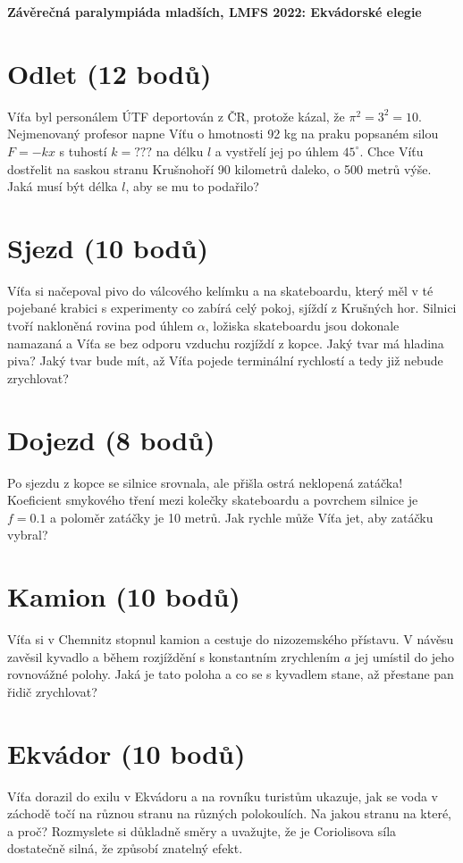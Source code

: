 \documentclass[10pt,a4paper,landscape]{article}
\author{Ondřej Zelenka}
\begin{document}
\pagestyle{empty}
\textbf{\center\LARGE Závěrečná paralympiáda mladších, LMFS 2022: Ekvádorské elegie}

\begin{multicols}{2}[]

\section{Odlet (12 bodů)}
Víťa byl personálem ÚTF deportován z ČR, protože kázal, že $\pi^2=3^2=10$. Nejmenovaný profesor napne Víťu o hmotnosti 92 kg na praku popsaném silou $F = -kx$ s tuhostí $k = ???$ na délku $l$ a vystřelí jej po úhlem $45^\circ$. Chce Víťu dostřelit na saskou stranu Krušnohoří 90 kilometrů daleko, o 500 metrů výše. Jaká musí být délka $l$, aby se mu to podařilo?

\section{Sjezd (10 bodů)}
Víťa si načepoval pivo do válcového kelímku a na skateboardu, který měl v té pojebané krabici s experimenty co zabírá celý pokoj, sjíždí z Krušných hor. Silnici tvoří nakloněná rovina pod úhlem $\alpha$, ložiska skateboardu jsou dokonale namazaná a Víťa se bez odporu vzduchu rozjíždí z kopce. Jaký tvar má hladina piva? Jaký tvar bude mít, až Víťa pojede terminální rychlostí a tedy již nebude zrychlovat?

\section{Dojezd (8 bodů)}
Po sjezdu z kopce se silnice srovnala, ale přišla ostrá neklopená zatáčka! Koeficient smykového tření mezi kolečky skateboardu a povrchem silnice je $f=0.1$ a poloměr zatáčky je 10 metrů. Jak rychle může Víťa jet, aby zatáčku vybral?

\section{Kamion (10 bodů)}
Víťa si v Chemnitz stopnul kamion a cestuje do nizozemského přístavu. V návěsu zavěsil kyvadlo a během rozjíždění s konstantním zrychlením $a$ jej umístil do jeho rovnovážné polohy. Jaká je tato poloha a co se s kyvadlem stane, až přestane pan řidič zrychlovat?

\section{Ekvádor (10 bodů)}
Víťa dorazil do exilu v Ekvádoru a na rovníku turistům ukazuje, jak se voda v záchodě točí na různou stranu na různých polokoulích. Na jakou stranu na které, a proč? Rozmyslete si důkladně směry a uvažujte, že je Coriolisova síla dostatečně silná, že způsobí znatelný efekt.


\end{multicols}
\end{document}
